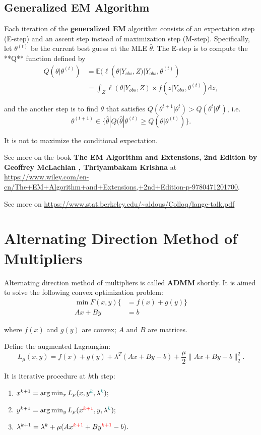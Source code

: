 \documentclass[titlestyle=hang,11pt]{elegantbook}
\begin{document}
\subsection{Generalized EM Algorithm}

Each iteration of the \textbf{generalized EM} algorithm consists of an expectation step (E-step) and an ascent step instead of maximization step (M-step).
Specifically, let $\theta^{(t)}$ be the current best guess at the MLE $\hat\theta$. The E-step
is to compute the **Q** function defined by
\begin{align}
Q(\theta|\theta^{(t)}) &= \mathbb{E}(\ell(\theta|Y_{obs}, Z)|Y_{obs},\theta^{(t)}) \\
                       &= \int_{Z}\ell(\theta|Y_{obs}, Z)\times f(z|Y_{obs}, \theta^{(t)})\mathrm{d}z,
\end{align}

and the another step is to find  $\theta$ that satisfies $Q(\theta^{t+1}|\theta^{t})>Q(\theta^{t}|\theta^{t})$, i.e.
$$\theta^{(t+1)}\in \{\hat{\theta}|Q(\hat{\theta}|\theta^{(t)} \geq Q(\theta|\theta^{(t)}) \}.$$

It is not to maximize the conditional expectation.

See more on the book \textbf{The EM Algorithm and Extensions, 2nd Edition
by Geoffrey McLachlan , Thriyambakam Krishna} at \url{https://www.wiley.com/en-cn/The+EM+Algorithm+and+Extensions,+2nd+Edition-p-9780471201700}.

See more on \url{https://www.stat.berkeley.edu/~aldous/Colloq/lange-talk.pdf}

\section{Alternating Direction Method of Multipliers}

Alternating direction method of multipliers is called \textbf{ADMM} shortly.
It is aimed to solve the following convex optimization problem:
\begin{align}
  \min F(x,y) \{&=f(x)+g(y)\} \tag {cost function} \\
          Ax+By &=b           \tag{constraint}
\end{align}

where $f(x)$ and $g(y)$ are convex; $A$ and $B$ are matrices.

Define the augmented Lagrangian:
$$ L_{\mu}(x,y)=f(x)+g(y)+\lambda^{T}(Ax+By-b)+\frac{\mu}{2}\|Ax+By-b\|_{2}^{2}. $$

It is iterative procedure at $k$th step:
\begin{enumerate}
\item $x^{k+1}=\arg\min_{x}L_{\mu}(x,y^{\color{teal}{k}},\lambda^{\color{teal}{k}});$
\item $y^{k+1}=\arg\min_{y} L_{\mu}(x^{\color{red}{k+1}}, y, \lambda^{\color{teal}{k}});$
\item $\lambda^{k+1} = \lambda^{k}+\mu (Ax^{\color{red}{k+1}} + By^{\color{red}{k+1}}-b).$
\end{enumerate}
\end{document}
